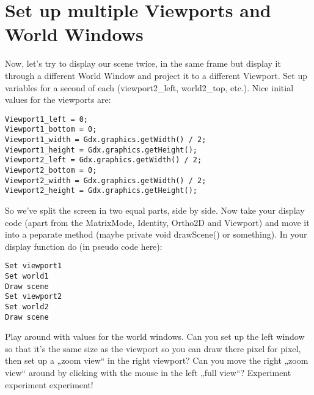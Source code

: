 \documentclass[11pt,a4paper]{article}
\begin{document}
\section{Set up multiple Viewports and World Windows}
Now, let's try to display our scene twice, in the same frame but display it
through a different World Window and project it to a different Viewport.  Set
up variables for a second of each (viewport2\_left, world2\_top, etc.).  Nice
initial values for the viewports are:
\begin{lstlisting}
Viewport1_left = 0;
Viewport1_bottom = 0;
Viewport1_width = Gdx.graphics.getWidth() / 2; 
Viewport1_height = Gdx.graphics.getHeight(); 
Viewport2_left = Gdx.graphics.getWidth() / 2; 
Viewport2_bottom = 0;
Viewport2_width = Gdx.graphics.getWidth() / 2; 
Viewport2_height = Gdx.graphics.getHeight(); 
\end{lstlisting}
So we've split the screen in two equal parts, side by side.
Now take your display code (apart from the MatrixMode, Identity, Ortho2D and
Viewport) and move it into a peparate method (maybe private void drawScene() or
something).  In your display function do (in pseudo code here): 
\begin{lstlisting}
Set viewport1
Set world1 
Draw scene 
Set viewport2 
Set world2 
Draw scene 
\end{lstlisting}
Play around with values for the world windows.  Can you set up the left window
so that it's the same size as the viewport so you can draw there pixel for
pixel, then set up a „zoom view“ in the right viewport?  Can you move the right
„zoom view“ around by clicking with the mouse in the left „full view“?
Experiment experiment
experiment!
\end{document}
